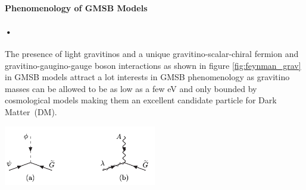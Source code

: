 {\paragraph{Phenomenology of GMSB Models}
\paragraph*{•}
The presence of light gravitinos and a unique gravitino-scalar-chiral fermion and gravitino-gaugino-gauge boson interactions as shown in figure \ref{fig:feynman_grav}  in GMSB models attract a lot interests in GMSB phenomenology as gravitino masses can be allowed to be as low as a few eV and only bounded by cosmological models making them an excellent candidate particle for Dark Matter~(DM).

\begin{center}
\centering
\mbox{\includegraphics[height=0.3\textwidth, width=0.5\textwidth]{THESISPLOTS/Gravitino-GauginoCoupling.png}} 
\label{fig:feynman_grav}
\end{center}

}
